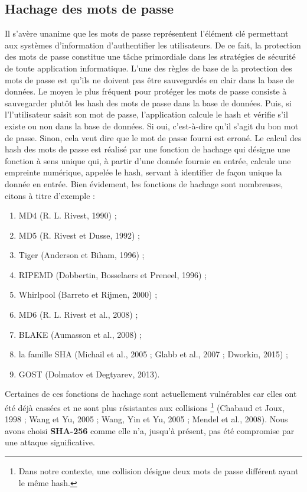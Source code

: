 \subsection{Hachage des mots de passe}
Il s’avère unanime que les mots de passe représentent l’élément clé permettant aux systèmes d’information
d’authentifier les utilisateurs. De ce fait, la protection des mots de passe constitue une tâche
primordiale dans les stratégies de sécurité de toute application informatique. \newline
L’une des règles de base de la protection des mots de passe est qu’ils ne doivent pas être sauvegardés
en clair dans la base de données. Le moyen le plus fréquent pour protéger les mots de passe consiste
à sauvegarder plutôt les hash des mots de passe dans la base de données. Puis, si l’l’utilisateur saisit
son mot de passe, l’application calcule le hash et vérifie s’il existe ou non dans la base de données. Si
oui, c’est-à-dire qu’il s’agit du bon mot de passe. Sinon, cela veut dire que le mot de passe fourni est
erroné. \newline
Le calcul des hash des mots de passe est réalisé par une fonction de hachage qui désigne une
fonction à sens unique qui, à partir d’une donnée fournie en entrée, calcule une empreinte numérique,
appelée le hash, servant à identifier de façon unique la donnée en entrée. Bien évidement, les fonctions
de hachage sont nombreuses, citons à titre d’exemple :
\begin{enumerate}
	\item MD4 (R. L. Rivest, 1990) ;
	\item MD5 (R. Rivest et Dusse, 1992) ;
	\item Tiger (Anderson et Biham, 1996) ;
	\item RIPEMD (Dobbertin, Bosselaers et Preneel, 1996) ;
	\item Whirlpool (Barreto et Rijmen, 2000) ;
	\item MD6 (R. L. Rivest et al., 2008) ;
	\item BLAKE (Aumasson et al., 2008) ;
	\item la famille SHA (Michail et al., 2005 ; Glabb et al., 2007 ; Dworkin, 2015) ;
	\item GOST (Dolmatov et Degtyarev, 2013).
	\newline
\end{enumerate}
Certaines de ces fonctions de hachage sont actuellement vulnérables car elles ont été déjà cassées
et ne sont plus résistantes aux collisions \footnote{Dans notre contexte, une collision désigne deux mots de passe différent ayant le même hash.} (Chabaud et Joux, 1998 ; Wang et Yu, 2005 ; Wang, Yin et Yu, 2005 ; Mendel et al., 2008). Nous avons choisi \textbf{SHA-256} comme elle n’a, jusqu’à présent, pas été compromise par une attaque significative.

